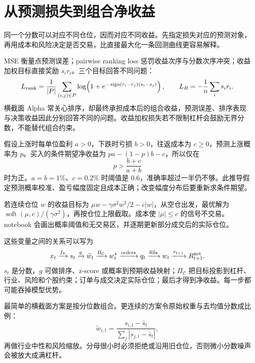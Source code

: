 \section{从预测损失到组合净收益}
\label{ch:lower-ml-research}

\begin{itemize}
  
\end{itemize}

同一个分数可以对应不同仓位，因而对应不同收益。先指定损失对应的预测对象，再用成本和风险决定是否交易，比直接最大化一条回测曲线更容易解释。





MSE 衡量点预测误差；pairwise ranking loss 惩罚收益次序与分数次序冲突；收益加权目标直接奖励 $s_ir_i$。三个目标回答不同问题：
\[
L_{\rm rank}=\frac1{|P|}\sum_{(i,j)\in P}
\log\!\left(1+e^{-\operatorname{sign}(r_i-r_j)(s_i-s_j)}\right),
\qquad L_R=-\frac1n\sum_i s_ir_i.
\]
横截面 Alpha 常关心排序，却最终承担成本后的组合收益，预测误差、排序表现与决策收益因此分别回答不同的问题。收益加权损失若不限制杠杆会鼓励无界分数，不能替代组合约束。


假设上涨时每单位盈利 $a>0$，下跌时亏损 $b>0$，往返成本为 $c\geq0$，预测上涨概率为 $p$。买入的条件期望净收益为 $pa-(1-p)b-c$，所以仅在
\[
 p>\frac{b+c}{a+b}
\]
时为正。$a=b=1\%$、$c=0.2\%$ 时阈值是 0.6，准确率超过一半仍不够。此推导假定预测概率校准、盈亏幅度固定且成本正确；改变幅度分布后要重新求条件期望。

若连续仓位 $w$ 的收益目标为 $\mu w-\gamma\sigma^2w^2/2-c|w|$，从空仓出发，最优解为 $\operatorname{soft}(\mu,c)/(\gamma\sigma^2)$，再按仓位上限截取。成本使 $|\mu|\leq c$ 的信号不交易。notebook 会画出概率阈值和无交易区，并逐期更新部分成交后的实际仓位。


这些变量之间的关系可以写为
\[
x_t\xrightarrow{f_\theta}s_t
\xrightarrow{g}\tilde w_t
\xrightarrow{\Pi_\mathcal C}w_t^*
\xrightarrow{\mathrm{orders}}q_t
\xrightarrow{\mathrm{fills}}w_t
\xrightarrow{r_{t+1}}R_{t+1}^{\rm net}.
\]
$s_t$ 是分数，$g$ 可做排序、z-score 或概率到预期收益映射；$\Pi_\mathcal C$ 把目标投影到杠杆、行业、风险和个股约束；订单与成交决定实际仓位；最后才得到净收益。每一步都可能吞掉模型优势。

最简单的横截面方案是按分位数组合。更连续的方案令原始权重与去均值分数成比例：
\[
\tilde w_{i,t}=\frac{s_{i,t}-\bar s_t}
{\sum_j|s_{j,t}-\bar s_t|},
\]
再做行业中性和风险缩放。分母很小时必须拒绝或沿用旧仓位，否则微小分数噪声会被放大成满杠杆。

